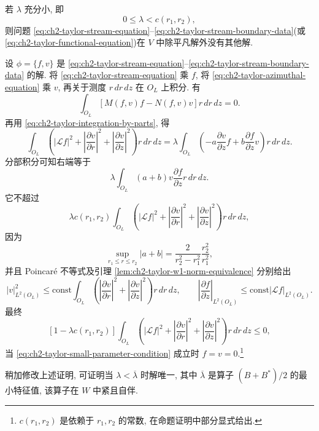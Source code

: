 \begin{Proposition}
\label{prop:ch2-taylor-small-parameter-uniqueness}
若 $\lambda$ 充分小, 即
\begin{equation}
0\leq\lambda<c(r_1,r_2),
\label{eq:ch2-taylor-small-parameter-condition}
\end{equation}
则问题 \eqref{eq:ch2-taylor-stream-equation}--\eqref{eq:ch2-taylor-stream-boundary-data}(或 \eqref{eq:ch2-taylor-functional-equation})在 $V$ 中除平凡解外没有其他解.
\end{Proposition}

\begin{Proof}
设 $\phi=\{f,v\}$ 是 \eqref{eq:ch2-taylor-stream-equation}--\eqref{eq:ch2-taylor-stream-boundary-data} 的解. 将 \eqref{eq:ch2-taylor-stream-equation} 乘 $f$, 将 \eqref{eq:ch2-taylor-azimuthal-equation} 乘 $v$, 再关于测度 $r\,dr\,dz$ 在 $O_L$ 上积分. 有
\[
\int_{O_L}[M(f,v)f-N(f,v)v]r\,dr\,dz=0.
\]
再用 \eqref{eq:ch2-taylor-integration-by-parts}, 得
\[
\int_{O_L}\left(|\mathcal Lf|^2+\left|\frac{\partial v}{\partial r}\right|^2
+\left|\frac{\partial v}{\partial z}\right|^2\right)r\,dr\,dz
=\lambda\int_{O_L}\left(-a\frac{\partial v}{\partial z}f
+b\frac{\partial f}{\partial z}v\right)r\,dr\,dz.
\]
分部积分可知右端等于
\[
\lambda\int_{O_L}(a+b)v\frac{\partial f}{\partial z}r\,dr\,dz.
\]
它不超过
\[
\lambda c(r_1,r_2)\int_{O_L}\left(|\mathcal Lf|^2
+\left|\frac{\partial v}{\partial r}\right|^2
+\left|\frac{\partial v}{\partial z}\right|^2\right)r\,dr\,dz,
\]
因为
\[
\sup_{r_1\leq r\leq r_2}|a+b|
=\frac2{r_2^2-r_1^2}\frac{r_2^2}{r_1^2},
\]
并且 Poincaré 不等式及引理 \ref{lem:ch2-taylor-w1-norm-equivalence} 分别给出
\[
|v|_{L^2(O_L)}^2\leq\mathrm{const}
\int_{O_L}\left(
\left|\frac{\partial v}{\partial r}\right|^2
+\left|\frac{\partial v}{\partial z}\right|^2\right)r\,dr\,dz,
\qquad
\left|\frac{\partial f}{\partial z}\right|_{L^2(O_L)}
\leq\mathrm{const}|\mathcal Lf|_{L^2(O_L)}.
\]
最终
\[
[1-\lambda c(r_1,r_2)]
\int_{O_L}\left(|\mathcal Lf|^2
+\left|\frac{\partial v}{\partial r}\right|^2
+\left|\frac{\partial v}{\partial z}\right|^2\right)r\,dr\,dz\leq0,
\]
当 \eqref{eq:ch2-taylor-small-parameter-condition} 成立时 $f=v=0$.\footnote{$c(r_1,r_2)$ 是依赖于 $r_1,r_2$ 的常数, 在命题证明中部分显式给出.}
\end{Proof}
\hypertarget{chapter-02-page-173}{}
\begin{Remark}
\label{rem:ch2-taylor-sharper-uniqueness}
稍加修改上述证明, 可证明当 $\lambda<\overline\lambda$ 时解唯一, 其中 $\overline\lambda$ 是算子 $(B+B^*)/2$ 的最小特征值, 该算子在 $W$ 中紧且自伴.
\end{Remark}

